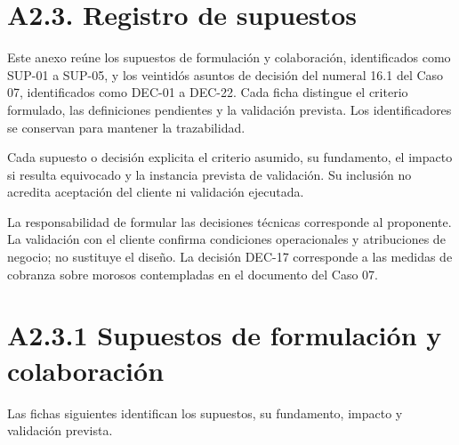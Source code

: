 \section*{A2.3. Registro de supuestos}
Este anexo reúne los supuestos de formulación y colaboración, identificados como SUP-01 a SUP-05, y los veintidós asuntos de decisión del numeral 16.1 del Caso 07, identificados como DEC-01 a DEC-22. Cada ficha distingue el criterio formulado, las definiciones pendientes y la validación prevista. Los identificadores se conservan para mantener la trazabilidad.

Cada supuesto o decisión explicita el criterio asumido, su fundamento, el impacto si resulta equivocado y la instancia prevista de validación. Su inclusión no acredita aceptación del cliente ni validación ejecutada.

La responsabilidad de formular las decisiones técnicas corresponde al proponente. La validación con el cliente confirma condiciones operacionales y atribuciones de negocio; no sustituye el diseño. La decisión DEC-17 corresponde a las medidas de cobranza sobre morosos contempladas en el documento del Caso 07.


\section*{A2.3.1 Supuestos de formulación y colaboración}
Las fichas siguientes identifican los supuestos, su fundamento, impacto y validación prevista.

